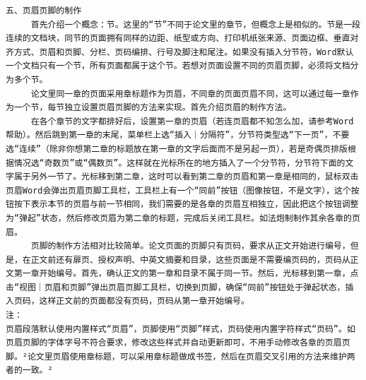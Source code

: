 \begin{verbatim}
五、页眉页脚的制作 
     首先介绍一个概念：节。这里的“节”不同于论文里的章节，但概念上是相似的。节是一段连续的文档块，同节的页面拥有同样的边距、纸型或方向、打印机纸张来源、页面边框、垂直对齐方式、页眉和页脚、分栏、页码编排、行号及脚注和尾注。如果没有插入分节符，Word默认一个文档只有一个节，所有页面都属于这个节。若想对页面设置不同的页眉页脚，必须将文档分为多个节。 
     论文里同一章的页面采用章标题作为页眉，不同章的页面页眉不同，这可以通过每一章作为一个节，每节独立设置页眉页脚的方法来实现。首先介绍页眉的制作方法。 
     在各个章节的文字都排好后，设置第一章的页眉（若连页眉都不知怎么加，请参考Word帮助）。然后跳到第一章的末尾，菜单栏上选“插入｜分隔符”，分节符类型选“下一页”，不要选“连续”（除非你想第二章的标题放在第一章的文字后面而不是另起一页），若是奇偶页排版根据情况选“奇数页”或“偶数页”。这样就在光标所在的地方插入了一个分节符，分节符下面的文字属于另外一节了。光标移到第二章，这时可以看到第二章的页眉和第一章是相同的，鼠标双击页眉Word会弹出页眉页脚工具栏，工具栏上有一个“同前”按钮（图像按钮，不是文字），这个按钮按下表示本节的页眉与前一节相同，我们需要的是各章的页眉互相独立，因此把这个按钮调整为“弹起”状态，然后修改页眉为第二章的标题，完成后关闭工具栏。如法炮制制作其余各章的页眉。 
     页脚的制作方法相对比较简单。论文页面的页脚只有页码，要求从正文开始进行编号，但是，在正文前还有扉页、授权声明、中英文摘要和目录，这些页面是不需要编页码的，页码从正文第一章开始编号。首先，确认正文的第一章和目录不属于同一节。然后，光标移到第一章，点击“视图｜页眉和页脚”弹出页眉页脚工具栏，切换到页脚，确保“同前”按钮处于弹起状态，插入页码，这样正文前的页面都没有页码，页码从第一章开始编号。 
注： 
页眉段落默认使用内置样式“页眉”，页脚使用“页脚”样式，页码使用内置字符样式“页码”。如页眉页脚的字体字号不符合要求，修改这些样式并自动更新即可，不用手动修改各章的页眉页脚。²论文里页眉使用章标题，可以采用章标题做成书签，然后在页眉交叉引用的方法来维护两者的一致。²
 

\end{verbatim}
